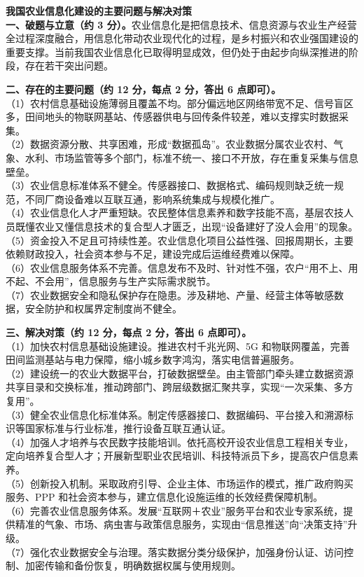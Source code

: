 \documentclass[a4paper,11pt]{article}
\begin{document}
\newpage
{}

\q \textbf{我国农业信息化建设的主要问题与解决对策}\\
\textbf{一、破题与立意（约 3 分）。}农业信息化是把信息技术、信息资源与农业生产经营全过程深度融合，用信息化带动农业现代化的过程，是乡村振兴和农业强国建设的重要支撑。当前我国农业信息化已取得明显成效，但仍处于由起步向纵深推进的阶段，存在若干突出问题。

\textbf{二、存在的主要问题（约 12 分，每点 2 分，答出 6 点即可）。}\\
（1）农村信息基础设施薄弱且覆盖不均。部分偏远地区网络带宽不足、信号盲区多，田间地头的物联网基站、传感器供电与回传条件较差，难以支撑实时数据采集。\\
（2）数据资源分散、共享困难，形成“数据孤岛”。农业数据分属农业农村、气象、水利、市场监管等多个部门，标准不统一、接口不开放，存在重复采集与信息壁垒。\\
（3）农业信息标准体系不健全。传感器接口、数据格式、编码规则缺乏统一规范，不同厂商设备难以互联互通，影响系统集成与规模化推广。\\
（4）农业信息化人才严重短缺。农民整体信息素养和数字技能不高，基层农技人员既懂农业又懂信息技术的复合型人才匮乏，出现“设备建好了没人会用”的现象。\\
（5）资金投入不足且可持续性差。农业信息化项目公益性强、回报周期长，主要依赖财政投入，社会资本参与不足，建设完成后运维经费难以保障。\\
（6）农业信息服务体系不完善。信息发布不及时、针对性不强，农户“用不上、用不起、不会用”，信息服务与生产实际需求脱节。\\
（7）农业数据安全和隐私保护存在隐患。涉及耕地、产量、经营主体等敏感数据，安全防护和权属界定制度尚不健全。

\textbf{三、解决对策（约 12 分，每点 2 分，答出 6 点即可）。}\\
（1）加快农村信息基础设施建设。推进农村千兆光网、5G 和物联网覆盖，完善田间监测基站与电力保障，缩小城乡数字鸿沟，落实电信普遍服务。\\
（2）建设统一的农业大数据平台，打破数据壁垒。由主管部门牵头建立数据资源共享目录和交换标准，推动跨部门、跨层级数据汇聚共享，实现“一次采集、多方复用”。\\
（3）健全农业信息化标准体系。制定传感器接口、数据编码、平台接入和溯源标识等国家标准与行业标准，推行设备互联互通认证。\\
（4）加强人才培养与农民数字技能培训。依托高校开设农业信息工程相关专业，定向培养复合型人才；开展新型职业农民培训、科技特派员下乡，提高农户信息素养。\\
（5）创新投入机制。采取政府引导、企业主体、市场运作的模式，推广政府购买服务、PPP 和社会资本参与，建立信息化设施运维的长效经费保障机制。\\
（6）完善农业信息服务体系。发展“互联网＋农业”服务平台和农业专家系统，提供精准的气象、市场、病虫害与政策信息服务，实现由“信息推送”向“决策支持”升级。\\
（7）强化农业数据安全与治理。落实数据分类分级保护，加强身份认证、访问控制、加密传输和备份恢复，明确数据权属与使用规则。
\end{document}
